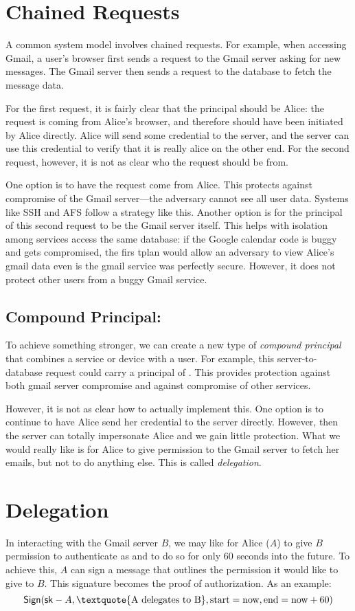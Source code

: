 \section{Chained Requests}
A common system model involves chained requests. For example, when accessing Gmail, a user's browser first sends a request to the Gmail server asking for new messages. The Gmail server then sends a request to the database to fetch the message data.

For the first request, it is fairly clear that the principal should be Alice: the request is coming from Alice's browser, and therefore should have been initiated by Alice directly. Alice will send some credential to the server, and the server can use this credential to verify that it is really alice on the other end. For the second request, however, it is not as clear who the request should be from.

One option is to have the request come from Alice. This protects against compromise of the Gmail server---the adversary cannot see all user data. Systems like SSH and AFS follow a strategy like this. Another option is for the principal of this second request to be the Gmail server itself. This helps with isolation among services access the same database: if the Google calendar code is buggy and gets compromised, the firs tplan would allow an adversary to view Alice's gmail data even is the gmail service was perfectly secure. However, it does not protect other users from a buggy Gmail service.

\subsection{Compound Principal: }
To achieve something stronger, we can create a new type of \emph{compound principal} that combines a service or device with a user. For example, this server-to-database request could carry a principal of . This provides protection against both gmail server compromise and against compromise of other services.

However, it is not as clear how to actually implement this. One option is to continue to have Alice send her credential to the server directly. However, then the server can totally impersonate Alice and we gain little protection. What we would really like is for Alice to give permission to the Gmail server to fetch her emails, but not to do anything else. This is called \emph{delegation}.

\section{Delegation}
In interacting with the Gmail server $B$, we may like for Alice ($A$) to give $B$ permission to authenticate as  and to do so for only 60 seconds into the future. To achieve this, $A$ can sign a message that outlines the permission it would like to give to $B$. This signature becomes the proof of authorization. As an example:
\[ \Sign(\sk-A, \text{\textquote{A delegates to B}}, \text{start}=\text{now}, \text{end}=\text{now}+60) \]

